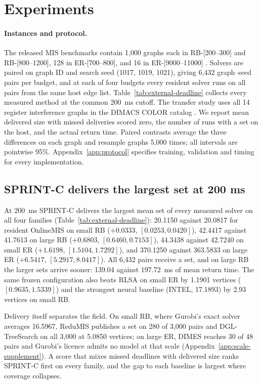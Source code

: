 \section{Experiments}


\label{sec:experiments}

\paragraph{Instances and protocol.}
The released MIS benchmarks contain 1,000 graphs each in RB-[200--300] and RB-[800--1200], 128 in ER-[700--800], and 16 in ER-[9000--11000] \citep{feng2025regularized}. Solvers are paired on graph ID and search seed (1017, 1019, 1021), giving 6,432 graph--seed pairs per budget, and at each of four budgets every resident solver runs on all pairs from the same host edge list. Table~\ref{tab:external-deadline} collects every measured method at the common 200~ms cutoff. The transfer study uses all 14 register interference graphs in the DIMACS COLOR catalog \citep{johnson1996dimacs}. We report mean delivered size with missed deliveries scored zero, the number of runs with a set on the host, and the actual return time. Paired contrasts average the three differences on each graph and resample graphs 5,000 times; all intervals are pointwise 95\%. Appendix~\ref{app:protocol} specifies training, validation and timing for every implementation.

\subsection{SPRINT-C delivers the largest set at 200 ms}

At 200~ms SPRINT-C delivers the largest mean set of every measured solver on all four families (Table~\ref{tab:external-deadline}): 20.1150 against 20.0817 for resident OnlineMIS on small RB ($+0.0333$, $[0.0253,0.0420]$), 42.4417 against 41.7613 on large RB ($+0.6803$, $[0.6460,0.7153]$), 44.3438 against 42.7240 on small ER ($+1.6198$, $[1.5104,1.7292]$), and 370.1250 against 363.5833 on large ER ($+6.5417$, $[5.2917,8.0417]$). All 6,432 pairs receive a set, and on large RB the larger sets arrive sooner: 139.04 against 197.72~ms of mean return time. The same frozen configuration also beats RLSA on small ER by 1.1901 vertices ($[0.9635,1.5339]$) and the strongest neural baseline (INTEL, 17.1893) by 2.93 vertices on small RB.

Delivery itself separates the field. On small RB, where Gurobi's exact solver averages 16.5967, ReduMIS publishes a set on 280 of 3,000 pairs and DGL-TreeSearch on all 3,000 at 5.0850 vertices; on large ER, DIMES reaches 30 of 48 pairs and Gurobi's licence admits no model at that scale (Appendix~\ref{app:scale-supplement}). A score that mixes missed deadlines with delivered size ranks SPRINT-C first on every family, and the gap to each baseline is largest where coverage collapses.

